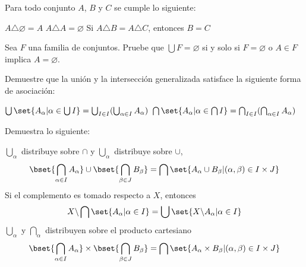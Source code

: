 \documentclass[fc]{tarea}
\newcommand{\menos}{\backslash}
\begin{document}
\begin{exercise}
    Para todo conjunto $A$, $B$ y $C$ se cumple lo siguiente:
    \begin{tasks}
    \task $A \triangle \varnothing = A$
    \task $A \triangle A = \varnothing$
    \task Si $A \triangle B = A \triangle C$, entonces $B = C$
    \end{tasks}
\end{exercise}

\begin{exercise}
    Sea $F$ una familia de conjuntos. Pruebe que $\bigcup F = \varnothing$ si y solo si $F = \varnothing$
    o $A \in F$ implica $A = \varnothing$.
\end{exercise}

\begin{exercise}
    Demuestre que la unión y la intersección generalizada satisface la siguiente forma de asociación:
    
     \begin{tasks}
     \task $\bigcup \set{ A_\alpha | \alpha \in \bigcup I} = \bigcup_{I \in I} (\bigcup_{\alpha \in I}A_\alpha)$
     \task $\bigcap \set{ A_\alpha | \alpha \in \bigcap I} = \bigcap_{I \in I} (\bigcap_{\alpha \in I}A_\alpha)$
     \end{tasks}
\end{exercise}

\begin{exercise}
    Demuestra lo siguiente:
    \begin{tasks}
        \task $\bigcup_\alpha$ distribuye sobre $\cap$ y $\bigcup_\alpha$ distribuye sobre $\cup$,
        $$\bset{\bigcap_{\alpha \in I} A_\alpha} \cup \bset{\bigcap_{\beta \in J} B_\beta} = \bigcap \set{A_\alpha \cup B_\beta | (\alpha,\beta) \in I\times J}$$
        \task Si el complemento es tomado respecto a $X$, entonces
        $$X\menos \bigcap \set{A_\alpha | \alpha \in I} = \bigcup \set{X\menos A_\alpha | \alpha \in I}$$
        \task $\bigcup_\alpha$ y $\bigcap_\alpha$ distribuyen sobre el producto cartesiano
        $$\bset{\bigcap_{\alpha \in I} A_\alpha} \times \bset{\bigcap_{\beta \in J} B_\beta} = \bigcap \set{A_\alpha \times B_\beta | (\alpha, \beta)\in I \times J}$$
    \end{tasks}
\end{exercise}
\end{document}
